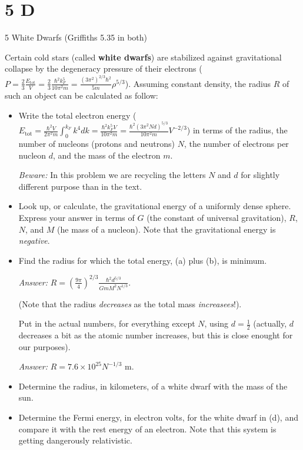 \documentclass{article}
\begin{document}
\newpage

\section*{5 D}
\begin{ques}
5 White Dwarfs (Griffiths 5.35 in both)

Certain cold stars (called \textbf{white dwarfs}) are stabilized against gravitational collapse by the degeneracy pressure of their electrons ($P = \frac{2}{3}\frac{E_\text{tot}}{V} = \frac{2}{3}\frac{\hbar^2 k^5_F}{10\pi^2 m} = \frac{(3\pi^2)^{2/3}\hbar^2}{5m}\rho^{5/3}$). Assuming constant density, the radius $R$ of such an object can be calculated as follow:
\begin{itemize}
    \item[(a)] Write the total electron energy ($E_\text{tot} = \frac{\hbar^2 V}{2\pi^2 m}\int_{0}^{k_F}k^4 dk = \frac{\hbar^2 k^5_F V}{10\pi^2 m} = \frac{\hbar^2(3\pi^2 Nd)^{5/3}}{10\pi^2 m}V^{-2/3}$) in terms of the radius, the number of nucleons (protons and neutrons) $N$, the number of electrons per nucleon $d$, and the mass of the electron $m$. 
    
    \emph{Beware:} In this problem we are recycling the letters $N$ and $d$ for slightly different purpose than in the text.

    \item[(b)] Look up, or calculate, the gravitational energy of a uniformly dense sphere. Express your answer in terms of $G$ (the constant of universal gravitation), $R$, $N$, and $M$ (he mass of a nucleon). Note that the gravitational energy is \emph{negative}.
    \item[(c)] Find the radius for which the total energy, (a) plus (b), is minimum.
    
    \emph{Answer:} $R = \left(\frac{9\pi}{4}\right)^{2/3}\frac{\hbar^2 d^{5/3}}{Gm M^2N^{1/3}}$.

    (Note that the radius \emph{decreases} as the total mass \emph{increasees}!).

    Put in the actual numbers, for everything except $N$, using $d=\frac{1}{2}$ (actually, $d$ decreases a bit as the atomic number increases, but this is close enought for our purposes). 
    
    \emph{Answer:} $R=7.6\times 10^{25}N^{-1/3}$ m.

    \item[(d)] Determine the radius, in kilometers, of a white dwarf with the mass of the sun.
    \item[(e)] Determine the Fermi energy, in electron volts, for the white dwarf in (d), and compare it with the rest energy of an electron. Note that this system is getting dangerously relativistic. 
\end{itemize}
\end{ques}
\end{document}
